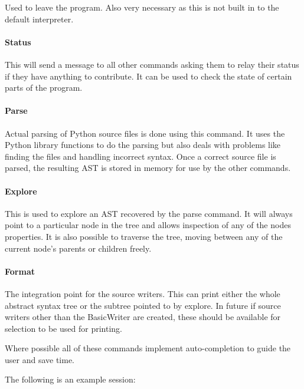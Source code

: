 \documentclass{report}
\begin{document}
Used to leave the program. Also very necessary as this is not built in to the default interpreter.

\paragraph{Status}

This will send a message to all other commands asking them to relay their status if they have anything to contribute. It can be
used to check the state of certain parts of the program.

\paragraph{Parse}

Actual parsing of Python source files is done using this command. It uses the Python library functions to do the parsing but also
deals with problems like finding the files and handling incorrect syntax. Once a correct source file is parsed, the resulting AST
is stored in memory for use by the other commands.

\paragraph{Explore}

This is used to explore an AST recovered by the parse command. It will always point to a particular node in the tree and allows
inspection of any of the nodes properties. It is also possible to traverse the tree, moving between any of the current node's parents or
children freely.

\paragraph{Format}

The integration point for the source writers. This can print either the whole abstract syntax tree or the subtree pointed to by
explore. In future if source writers other than the BasicWriter are created, these should be available for selection to be used for
printing.

Where possible all of these commands implement auto-completion to guide the user and save time.

The following is an example session:
\end{document}
